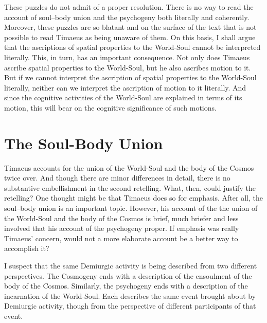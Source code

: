 These puzzles do not admit of a proper resolution. There is no way to read the account of soul--body union and the psychogeny both literally and coherently. Moreover, these puzzles are so blatant and on the surface of the text that is not possible to read Timaeus as being unaware of them. On this basis, I shall argue that the ascriptions of spatial properties to the World-Soul cannot be interpreted literally. This, in turn, has an important consequence. Not only does Timaeus ascribe spatial properties to the World-Soul, but he also ascribes motion to it. But if we cannot interpret the ascription of spatial properties to the World-Soul literally, neither can we interpret the ascription of motion to it literally. And since the cognitive activities of the World-Soul are explained in terms of its motion, this will bear on the cognitive significance of such motions.


\section{The Soul-Body Union} %
\label{sec:the_embodiment_of_the_world_soul}

Timaeus accounts for the union of the World-Soul and the body of the Cosmos twice over. And though there are minor differences in detail, there is no substantive embellishment in the second retelling. What, then, could justify the retelling? One thought might be that Timaeus does so for emphasis. After all, the soul--body union is an important topic. However, his account of the the union of the World-Soul and the body of the Cosmos is brief, much briefer and less involved that his account of the psychogeny proper. If emphasis was really Timaeus' concern, would not a more elaborate account be a better way to accomplish it? 

I suspect that the same Demiurgic activity is being described from two different perspectives. The Cosmogeny ends with a description of the ensoulment of the body of the Cosmos. Similarly, the psychogeny ends with a description of the incarnation of the World-Soul. Each describes the same event brought about by Demiurgic activity, though from the perspective of different participants of that event.


